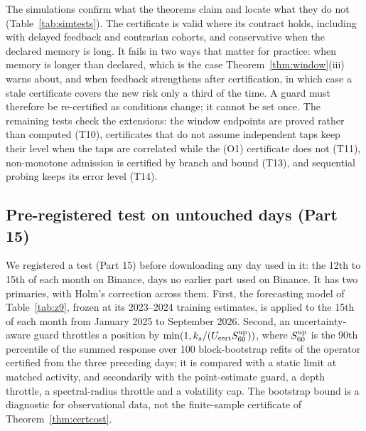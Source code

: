 \documentclass[12pt]{article}
\theoremstyle{definition}
\theoremstyle{remark}
\begin{document}
The simulations confirm what the theorems claim and locate what they do not (Table~\ref{tab:simtests}). The certificate is valid where its contract holds, including with delayed feedback and contrarian cohorts, and conservative when the declared memory is long. It fails in two ways that matter for practice: when memory is longer than declared, which is the case Theorem~\ref{thm:window}(iii) warns about, and when feedback strengthens after certification, in which case a stale certificate covers the new risk only a third of the time. A guard must therefore be re-certified as conditions change; it cannot be set once. The remaining tests check the extensions: the window endpoints are proved rather than computed (T10), certificates that do not assume independent taps keep their level when the taps are correlated while the (O1) certificate does not (T11), non-monotone admission is certified by branch and bound (T13), and sequential probing keeps its error level (T14).

\subsection{Pre-registered test on untouched days (Part 15)}\label{sec:p15}
We registered a test (Part 15) before downloading any day used in it: the 12th to 15th of each month on Binance, days no earlier part used on Binance. It has two primaries, with Holm's correction across them. First, the forecasting model of Table~\ref{tab:z9}, frozen at its 2023--2024 training estimates, is applied to the 15th of each month from January 2025 to September 2026. Second, an uncertainty-aware guard throttles a position by $\min(1,k_s/(U_{\rm cert}S^{\rm up}_{60}))$, where $S^{\rm up}_{60}$ is the 90th percentile of the summed response over 100 block-bootstrap refits of the operator certified from the three preceding days; it is compared with a static limit at matched activity, and secondarily with the point-estimate guard, a depth throttle, a spectral-radius throttle and a volatility cap. The bootstrap bound is a diagnostic for observational data, not the finite-sample certificate of Theorem~\ref{thm:certcost}.
\end{document}
